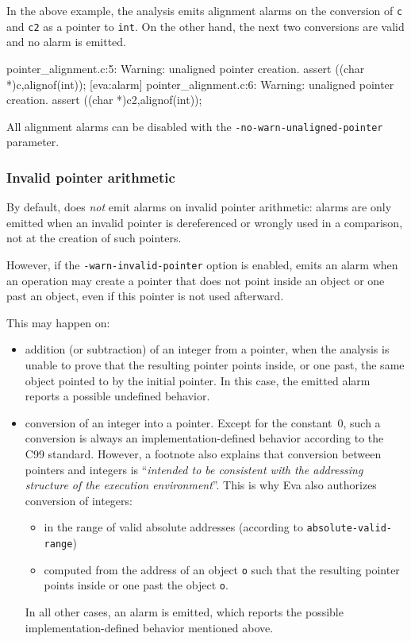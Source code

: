 \documentclass{frama-c-book}
\newcommand{\isoc}{\textsf{C99}}
\begin{document}

In the above example, the analysis emits alignment alarms on the conversion of
\lstinline|c| and \lstinline|c2| as a pointer to \lstinline|int|.
On the other hand, the next two conversions are valid and no alarm is emitted.

\begin{logsmath}
 pointer_alignment.c:5: Warning:
  unaligned pointer creation. assert \aligned((char *)c,alignof(int));
[eva:alarm] pointer_alignment.c:6: Warning:
  unaligned pointer creation. assert \aligned((char *)c2,alignof(int));
\end{logsmath}

All alignment alarms can be disabled with the
\lstinline|-no-warn-unaligned-pointer| parameter.


\subsubsection{Invalid pointer arithmetic}

By default, \Eva{} does \emph{not} emit alarms on invalid pointer arithmetic:
alarms are only emitted when an invalid pointer is dereferenced or wrongly used
in a comparison, not at the creation of such pointers.

However, if the \lstinline|-warn-invalid-pointer| option is enabled,
\Eva{} emits an alarm when an operation may create a pointer that does
not point inside an object or one past an object,
even if this pointer is not used afterward.

This may happen on:
\begin{itemize}
\item addition (or subtraction) of an integer from a pointer, when the analysis
  is unable to prove that the resulting pointer points inside, or one past,
  the same object pointed to by the initial pointer.
  In this case, the emitted alarm reports a possible undefined behavior.
\item conversion of an integer into a pointer. Except for the constant~0,
  such a conversion is always an implementation-defined behavior
  according to the \isoc{} standard. However, a footnote also explains that
  conversion between pointers and integers is ``\emph{intended to
  be consistent with the addressing structure of the execution environment}''.
  This is why Eva also authorizes conversion of integers:
  \begin{itemize}
  \item in the range of valid absolute addresses
    (according to \texttt{absolute-valid-range})
  \item computed from the address of an object \lstinline|o| such that the
    resulting pointer points inside or one past the object \lstinline|o|.
  \end{itemize}
  In all other cases, an alarm is emitted, which reports the possible
  implementation-defined behavior mentioned above.
\end{itemize}
\end{document}
